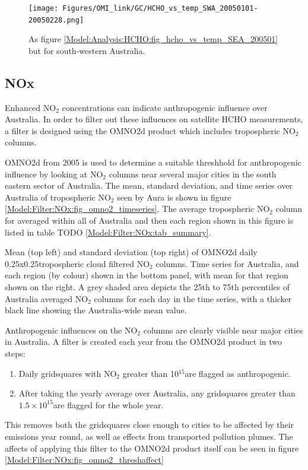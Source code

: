         \begin{figure}
          \texttt{[image: Figures/OMI\_link/GC/HCHO\_vs\_temp\_SWA\_20050101-20050228.png]}
          \caption{%
            As figure \ref{Model:Analysis:HCHO:fig_hcho_vs_temp_SEA_200501} but for south-western Australia.
            }
          \label{Model:Analysis:HCHO:fig_hcho_vs_temp_SWA_200501}
        \end{figure}
  
  \subsection{NOx}
    \label{Model:Filter:NOx}
    
    Enhanced NO$_2$ concentrations can indicate anthropogenic influence over Australia.
    In order to filter out these influences on satellite HCHO measurements, a filter is designed using the OMNO2d product which includes tropospheric NO$_2$ columns.
    
    OMNO2d from 2005 is used to determine a suitable threshhold for anthropogenic influence by looking at NO$_2$ columns near several major cities in the south eastern sector of Australia.
    The mean, standard deviation, and time series over Australia of tropospheric NO$_2$ seen by Aura is shown in figure \ref{Model:Filter:NOx:fig_omno2_timeseries}.
    The average tropospheric NO$_2$ column for averaged within all of Australia and then each region shown in this figure is listed in table TODO \ref{Model:Filter:NOx:tab_summary}.
    
    {Mean (top left) and standard deviation (top right) of OMNO2d daily 0.25x0.25\degr tropospheric cloud filtered NO$_2$ columns. Time series for Australia, and each region (by colour) shown in the bottom panel, with mean for that region shown on the right. A grey shaded area depicts the 25th to 75th percentiles of Australia averaged NO$_2$ columns for each day in the time series, with a thicker black line showing the Australia-wide mean value.}
    {\label{Model:Filter:NOx:fig_omno2_timeseries}}
    
    Anthropogenic influences on the NO$_2$ columns are clearly visible near major cities in Australia.
    A filter is created each year from the OMNO2d product in two steps:
    \begin{enumerate}
      \item Daily gridsquares with NO$_2$ greater than 10$^{15}$\moleccm  are flagged as anthropogenic.
      \item After taking the yearly average over Australia, any gridsquares greater than $1.5 \times 10^{15}$\moleccm are flagged for the whole year.
    \end{enumerate}
    This removes both the gridsquares close enough to cities to be affected by their emissions year round, as well as effects from transported pollution plumes.
    The affects of applying this filter to the OMNO2d product itself can be seen in figure \ref{Model:Filter:NOx:fig_omno2_threshaffect}
    
